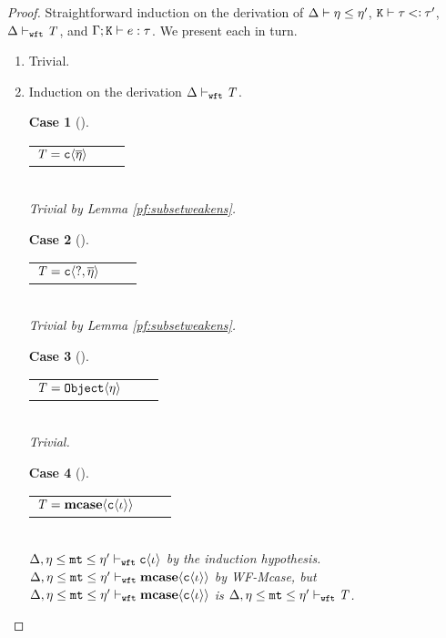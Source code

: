 \documentclass[onecolumn,nocopyrightspace]{sigplanconf}
\theoremstyle{lessintrusive}
\theoremstyle{plain}
\theoremstyle{custom}
\newtheorem*{case}{Case}
\def\econsexp#1#2#3{#1\msub#2\msub#3}
\begin{document}
\begin{proof}
Straightforward induction on the derivation of $\Delta \vdash \eta\leq\eta'$, $\mathtt{K} \vdash \tau \mathbin{<\vcentcolon} \tau'$, $\Delta \vdash_{\tt wft} \mathit{T}$, and $\Gamma;\mathtt{K} \vdash e : \tau$. We present each in turn.
\leavevmode
\begin{enumerate}[(\arabic*)]
\item Trivial.

\item Induction on the derivation $\tspec \judgewft \bt$.
\begin{case}[] 
\begin{tabular}{>{$}l<{$} >{$}l<{$} >{$}l<{$}}
\bt = \Cname\lb\overline{\basemode}\rb & & \\
\end{tabular}\\ 
Trivial by Lemma \ref{pf:subsetweakens}.
\end{case}

\begin{case}[]
\begin{tabular}{>{$}l<{$} >{$}l<{$} >{$}l<{$}}
\bt = \Cname\lb\dynmode,\overline{\basemode}\rb \\
\end{tabular}\\
Trivial by Lemma \ref{pf:subsetweakens}. 
\end{case}

\begin{case}[] 
\begin{tabular}{>{$}l<{$} >{$}l<{$} >{$}l<{$}}
\bt = \Nobject\lb\basemode\rb \\
\end{tabular}\\
Trivial.
\end{case}

\begin{case}[] 
\begin{tabular}{>{$}l<{$} >{$}l<{$} >{$}l<{$}}
\bt = \tmcase{\classiota} \\
\end{tabular}\\
$\tspec,\econsexp{\basemode}{\mtvar}{\basemode'} \judgewft \classiota$ by the induction hypothesis. $\tspec,\econsexp{\basemode}{\mtvar}{\basemode'} \judgewft \tmcase{\classiota}$ by WF-Mcase, but $\tspec,\econsexp{\basemode}{\mtvar}{\basemode'} \judgewft \tmcase{\classiota}$ is $\tspec,\econsexp{\basemode}{\mtvar}{\basemode'} \judgewft \bt$.
\end{case}


\end{enumerate}
\end{proof}
\end{document}
